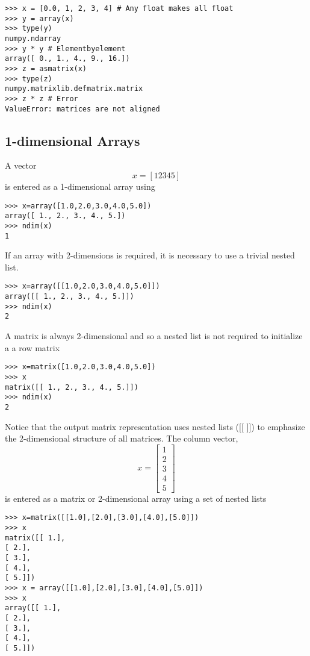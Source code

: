 \documentclass[KSmain.tex]{subfiles}
\begin{document}
\begin{framed}
\begin{verbatim}
>>> x = [0.0, 1, 2, 3, 4] # Any float makes all float
>>> y = array(x)
>>> type(y)
numpy.ndarray
>>> y * y # Elementbyelement
array([ 0., 1., 4., 9., 16.])
>>> z = asmatrix(x)
>>> type(z)
numpy.matrixlib.defmatrix.matrix
>>> z * z # Error
ValueError: matrices are not aligned
\end{verbatim}
\end{framed}
\newpage
\subsection{1-dimensional Arrays}
A vector
\[x = [1 2 3 4 5]\]
is entered as a 1-dimensional array using
\begin{framed}
\begin{verbatim}
>>> x=array([1.0,2.0,3.0,4.0,5.0])
array([ 1., 2., 3., 4., 5.])
>>> ndim(x)
1
\end{verbatim}
\end{framed}
If an array with 2-dimensions is required, it is necessary to use a trivial nested list.
\begin{framed}
\begin{verbatim}
>>> x=array([[1.0,2.0,3.0,4.0,5.0]])
array([[ 1., 2., 3., 4., 5.]])
>>> ndim(x)
2
\end{verbatim}
\end{framed}

A matrix is always 2-dimensional and so a nested list is not required to initialize a a row matrix
\begin{framed}
\begin{verbatim}
>>> x=matrix([1.0,2.0,3.0,4.0,5.0])
>>> x
matrix([[ 1., 2., 3., 4., 5.]])
>>> ndim(x)
2
\end{verbatim}
\end{framed}
Notice that the output matrix representation uses nested lists ([[ ]]) to emphasize the 2-dimensional
structure of all matrices. The column vector,
\[x =
\left[ 
\begin{array}{c}
1 \\
2 \\
3 \\
4 \\
5
\end{array}
\right]
\]
is entered as a matrix or 2-dimensional array using a set of nested lists
\begin{framed}
\begin{verbatim}
>>> x=matrix([[1.0],[2.0],[3.0],[4.0],[5.0]])
>>> x
matrix([[ 1.],
[ 2.],
[ 3.],
[ 4.],
[ 5.]])
>>> x = array([[1.0],[2.0],[3.0],[4.0],[5.0]])
>>> x
array([[ 1.],
[ 2.],
[ 3.],
[ 4.],
[ 5.]])
\end{verbatim}
\end{framed}
\newpage
\end{document}
